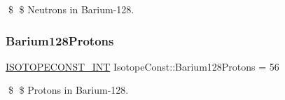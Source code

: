 \$ \$ Neutrons in Barium-\/128. \mbox{\label{group___isotope_const-_barium-_ba128_ga4e94c1ecc65140270eed8793090d044d}} 
\subsubsection{\texorpdfstring{Barium128\+Protons}{Barium128Protons}}
{\footnotesize\ttfamily \mbox{\hyperlink{group___isotope_const-_macros_ga5f18360b3e99483a35c32d789e62621c}{I\+S\+O\+T\+O\+P\+E\+C\+O\+N\+S\+T\+\_\+\+I\+NT}} Isotope\+Const\+::\+Barium128\+Protons = 56}

\$ \$ Protons in Barium-\/128. 